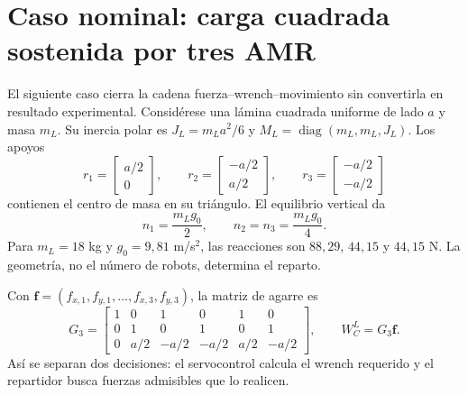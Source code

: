 \documentclass[12pt,a4paper]{article}
\begin{document}
\section*{Caso nominal: carga cuadrada sostenida por tres AMR}

El siguiente caso cierra la cadena fuerza--wrench--movimiento sin convertirla en
resultado experimental. Considérese una lámina cuadrada uniforme de lado $a$ y
masa $m_L$. Su inercia polar es $J_L=m_La^2/6$ y
$M_L=\operatorname{diag}(m_L,m_L,J_L)$. Los apoyos
\begin{equation}
r_1=\begin{bmatrix}a/2\\0\end{bmatrix},\qquad
r_2=\begin{bmatrix}-a/2\\a/2\end{bmatrix},\qquad
r_3=\begin{bmatrix}-a/2\\-a/2\end{bmatrix}
\label{eq:sp2-square-supports}
\end{equation}
contienen el centro de masa en su triángulo. El equilibrio vertical da
\begin{equation}
n_1=\frac{m_Lg_0}{2},\qquad
n_2=n_3=\frac{m_Lg_0}{4}.
\label{eq:sp2-square-normal-loads}
\end{equation}
Para $m_L=18$ kg y $g_0=9{,}81$ m/s$^2$, las reacciones son
$88{,}29$, $44{,}15$ y $44{,}15$ N. La geometría, no el número de robots,
determina el reparto.

Con $\mathbf f=(f_{x,1},f_{y,1},\ldots,f_{x,3},f_{y,3})$, la matriz de agarre
\parencite{nakamura1989dynamics,yoshikawa1993coordinated} es
\begin{equation}
G_3=\begin{bmatrix}
1&0&1&0&1&0\\
0&1&0&1&0&1\\
0&a/2&-a/2&-a/2&a/2&-a/2
\end{bmatrix},
\qquad W_C^{L}=G_3\mathbf f .
\label{eq:sp2-square-grasp}
\end{equation}
Así se separan dos decisiones: el servocontrol calcula el wrench requerido y el
repartidor busca fuerzas admisibles que lo realicen.
\end{document}
